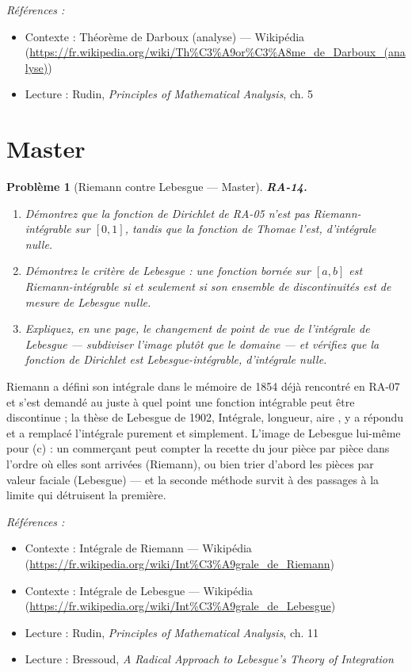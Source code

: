 \documentclass[11pt]{article}
\newtheorem{problem}{Problème}
\newenvironment{refs}{\par\small\noindent\emph{Références :}\begin{itemize}\setlength\itemsep{0pt}}{\end{itemize}\normalsize}
\begin{document}
\begin{refs}
\item Contexte : Théorème de Darboux (analyse) --- Wikipédia (\url{https://fr.wikipedia.org/wiki/Th%C3%A9or%C3%A8me_de_Darboux_(analyse)})
\item Lecture : Rudin, \textit{Principles of Mathematical Analysis}, ch. 5
\end{refs}

\bigskip


\section*{Master}

\begin{problem}[{Riemann contre Lebesgue --- Master}]
\textbf{RA-14.} \begin{enumerate}
\item[(a)] Démontrez que la fonction de Dirichlet de RA-05 n'est pas
Riemann-intégrable sur $ [0, 1] $, tandis que la fonction de Thomae l'est, d'intégrale nulle.
\item[(b)] Démontrez
le critère de Lebesgue : une fonction bornée sur $ [a, b] $ est Riemann-intégrable si et seulement
si son ensemble de discontinuités est de mesure de Lebesgue nulle.
\item[(c)] Expliquez, en une page, le changement de
point de vue de l'intégrale de Lebesgue --- subdiviser l'image plutôt que le domaine --- et
vérifiez que la fonction de Dirichlet est Lebesgue-intégrable, d'intégrale nulle.
\end{enumerate}

\end{problem}

\noindent Riemann a défini son intégrale dans le mémoire de 1854 déjà rencontré en RA-07 et
s'est demandé au juste à quel point une fonction intégrable peut être discontinue ; la thèse de
Lebesgue de 1902, \og{} Intégrale, longueur, aire \fg{}, y a répondu et a remplacé l'intégrale purement et
simplement. L'image de Lebesgue lui-même pour (c) : un commerçant peut compter la recette du jour
pièce par pièce dans l'ordre où elles sont arrivées (Riemann), ou bien trier d'abord les pièces par
valeur faciale (Lebesgue) --- et la seconde méthode survit à des passages à la limite qui détruisent
la première.

\begin{refs}
\item Contexte : Intégrale de Riemann --- Wikipédia (\url{https://fr.wikipedia.org/wiki/Int%C3%A9grale_de_Riemann})
\item Contexte : Intégrale de Lebesgue --- Wikipédia (\url{https://fr.wikipedia.org/wiki/Int%C3%A9grale_de_Lebesgue})
\item Lecture : Rudin, \textit{Principles of Mathematical Analysis}, ch. 11
\item Lecture : Bressoud, \textit{A Radical Approach to Lebesgue's Theory of Integration}
\end{refs}
\end{document}
